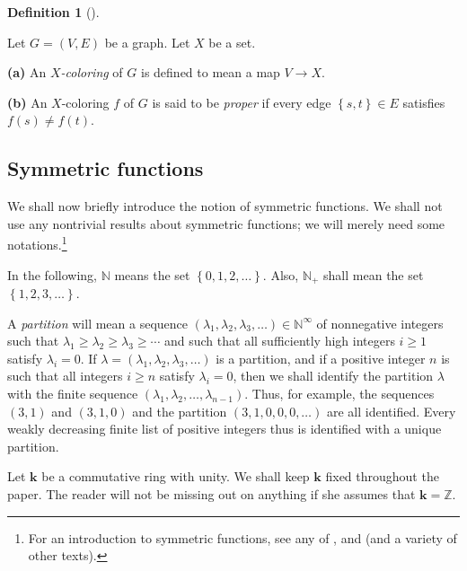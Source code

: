 \documentclass[numbers=enddot,12pt,final,onecolumn,notitlepage]{scrartcl}%
\theoremstyle{definition}
\newtheorem{defi}[theo]{Definition}
\newenvironment{definition}[1][]
{\begin{defi}[#1]\begin{leftbar}}
{\end{leftbar}\end{defi}}
\begin{document}
\begin{definition}
\label{def.coloring}Let $G=\left(  V,E\right)  $ be a graph. Let $X$ be a set.

\textbf{(a)} An $X$\textit{-coloring} of $G$ is defined to mean a map
$V\rightarrow X$.

\textbf{(b)} An $X$-coloring $f$ of $G$ is said to be \textit{proper} if every
edge $\left\{  s,t\right\}  \in E$ satisfies $f\left(  s\right)  \neq f\left(
t\right)  $.
\end{definition}

\subsection{Symmetric functions}

We shall now briefly introduce the notion of symmetric functions. We shall not
use any nontrivial results about symmetric functions; we will merely need some
notations.\footnote{For an introduction to symmetric functions, see any of
\cite[Chapter 7]{Stanley-EC2}, \cite[Chapter 9]{Martin15} and \cite[Chapter
2]{Reiner} (and a variety of other texts).}

In the following, $\mathbb{N}$ means the set $\left\{  0,1,2,\ldots\right\}
$. Also, $\mathbb{N}_{+}$ shall mean the set $\left\{  1,2,3,\ldots\right\}  $.

A \textit{partition} will mean a sequence $\left(  \lambda_{1},\lambda
_{2},\lambda_{3},\ldots\right)  \in\mathbb{N}^{\infty}$ of nonnegative
integers such that $\lambda_{1}\geq\lambda_{2}\geq\lambda_{3}\geq\cdots$ and
such that all sufficiently high integers $i\geq1$ satisfy $\lambda_{i}=0$. If
$\lambda=\left(  \lambda_{1},\lambda_{2},\lambda_{3},\ldots\right)  $ is a
partition, and if a positive integer $n$ is such that all integers $i\geq n$
satisfy $\lambda_{i}=0$, then we shall identify the partition $\lambda$ with
the finite sequence $\left(  \lambda_{1},\lambda_{2},\ldots,\lambda
_{n-1}\right)  $. Thus, for example, the sequences $\left(  3,1\right)  $ and
$\left(  3,1,0\right)  $ and the partition $\left(  3,1,0,0,0,\ldots\right)  $
are all identified. Every weakly decreasing finite list of positive integers
thus is identified with a unique partition.

Let $\mathbf{k}$ be a commutative ring with unity. We shall keep $\mathbf{k}$
fixed throughout the paper. The reader will not be missing out on anything if
she assumes that $\mathbf{k}=\mathbb{Z}$.
\end{document}
